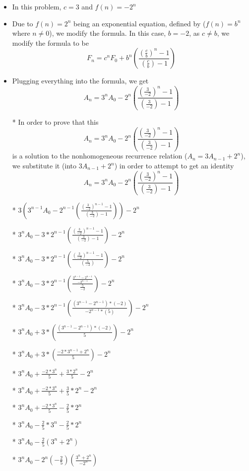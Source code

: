 \begin{enumerate}
\begin{enumerate}
\begin{itemize}
\begin{itemize}
      \item In this problem, $c=3$ and $f(n)=-2^{n}$
      \item Due to $f(n)=2^{n}$ being an exponential equation, defined by ($f(n)=b^{n}$ where $n\neq0$), we modify the formula. In this case, $b=-2$, as $c\neq b$, we modify the formula to be $$F_{n}=c^{n}F_{0} + b^{n}\left(\frac{(\frac{c}{b})^{n}-1}{(\frac{c}{b})-1}\right)$$
      \item Plugging everything into the formula, we get $$A_{n}=3^{n}A_{0} -2^{n}\left(\frac{(\frac{3}{-2})^{n}-1}{(\frac{3}{-2})-1}\right)$$
      \item [*] In order to prove that this $$A_{n}=3^{n}A_{0} -2^{n}\left(\frac{(\frac{3}{-2})^{n}-1}{(\frac{3}{-2})-1}\right)$$ is a solution to the nonhomogeneous recurrence relation ($A_{n}=3A_{n-1}+2^{n}$), we substitute it (into $3A_{n-1}+2^{n}$) in order to attempt to get an identity $$A_{n}=3^{n}A_{0} -2^{n}\left(\frac{(\frac{3}{-2})^{n}-1}{(\frac{3}{-2})-1}\right)$$
      \item [*] $3\left(3^{n-1}A_{0} -2^{n-1}\left(\frac{(\frac{3}{-2})^{n-1}-1}{(\frac{3}{-2})-1}\right)\right)-2^{n}$
      \item [*] $3^{n}A_{0} -3*2^{n-1}\left(\frac{(\frac{3}{-2})^{n-1}-1}{(\frac{3}{-2})-1}\right)-2^{n}$
      \item [*] $3^{n}A_{0} -3*2^{n-1}\left(\frac{(\frac{3}{-2})^{n-1}-1}{(\frac{5}{-2})}\right)-2^{n}$
      \item [*] $3^{n}A_{0} -3*2^{n-1}\left(\frac{\frac{3^{n-1}-2^{n-1}}{-2^{n-1} }}{\frac{5}{-2}}\right)-2^{n}$
      \item [*] $3^{n}A_{0} -3*2^{n-1}\left(\frac{(3^{n-1}-2^{n-1})*(-2)}{-2^{n-1}*(5) }\right)-2^{n}$
      \item [*] $3^{n}A_{0} +3*\left(\frac{(3^{n-1}-2^{n-1})*(-2)}{5}\right)-2^{n}$
      \item [*] $3^{n}A_{0} +3*\left(\frac{-2*3^{n-1}+2^{n}}{5}\right)-2^{n}$
      \item [*] $3^{n}A_{0} +\frac{-2*3^{n}}{5} +\frac{3*2^{n}}{5}-2^{n}$
      \item [*] $3^{n}A_{0} +\frac{-2*3^{n}}{5} +\frac{3}{5}*2^{n}-2^{n}$
      \item [*] $3^{n}A_{0} +\frac{-2*3^{n}}{5} -\frac{2}{5}*2^{n}$
      \item [*] $3^{n}A_{0} -\frac{2}{5}*3^{n} -\frac{2}{5}*2^{n}$
      \item [*] $3^{n}A_{0} -\frac{2}{5}\left(3^{n}+2^{n}\right)$
      \item [*] $3^{n}A_{0} -2^{n}(-\frac{2}{5})\left(\frac{3^{n}+2^{n}}{-2^{n}}\right)$

\end{itemize}
\end{itemize}
\end{enumerate}
\end{enumerate}
